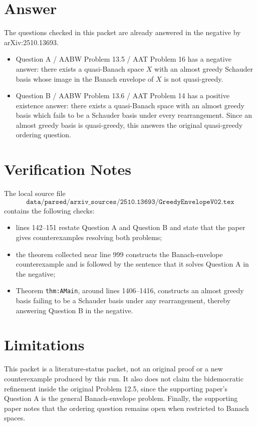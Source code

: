 \documentclass[11pt]{article}
\begin{document}
\section*{Answer}

The questions checked in this packet are already answered in the negative by
arXiv:2510.13693.

\begin{itemize}
\item Question A / AABW Problem 13.5 / AAT Problem 16 has a negative answer:
there exists a quasi-Banach space \(X\) with an almost greedy Schauder basis
whose image in the Banach envelope of \(X\) is not quasi-greedy.

\item Question B / AABW Problem 13.6 / AAT Problem 14 has a positive
existence answer: there exists a quasi-Banach space with an almost greedy
basis which fails to be a Schauder basis under every rearrangement. Since an
almost greedy basis is quasi-greedy, this answers the original quasi-greedy
ordering question.
\end{itemize}

\section*{Verification Notes}

The local source file
\[
\texttt{data/parsed/arxiv\_sources/2510.13693/GreedyEnvelopeV02.tex}
\]
contains the following checks:

\begin{itemize}
\item lines 142--151 restate Question A and Question B and state that the
paper gives counterexamples resolving both problems;
\item the theorem collected near line 999 constructs the Banach-envelope
counterexample and is followed by the sentence that it solves Question A in
the negative;
\item Theorem \texttt{thm:AMain}, around lines 1406--1416, constructs an
almost greedy basis failing to be a Schauder basis under any rearrangement,
thereby answering Question B in the negative.
\end{itemize}

\section*{Limitations}

This packet is a literature-status packet, not an original proof or a new
counterexample produced by this run. It also does not claim the bidemocratic
refinement inside the original Problem 12.5, since the supporting paper's
Question A is the general Banach-envelope problem. Finally, the supporting
paper notes that the ordering question remains open when restricted to Banach
spaces.
\end{document}
